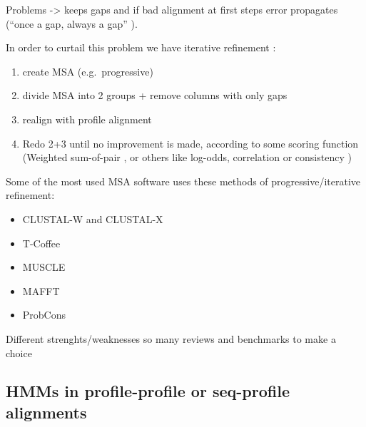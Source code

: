 \documentclass[
  11pt,
  twoside]{scrbook}
\providecommand{\tightlist}{%
  \setlength{\itemsep}{0pt}\setlength{\parskip}{0pt}}
\begin{document}
Problems -\textgreater{} keeps gaps and if bad alignment at first steps error propagates (``once a gap, always a gap'' \autocite{fengProgressiveSequenceAlignment1987}).

In order to curtail this problem we have iterative refinement \autocite{russellMultipleSequenceAlignment2014}:

\begin{enumerate}
\def\labelenumi{\arabic{enumi}.}
\tightlist
\item
  create MSA (e.g.~progressive)
\item
  divide MSA into 2 groups + remove columns with only gaps
\item
  realign with profile alignment
\item
  Redo 2+3 until no improvement is made, according to some scoring function (Weighted sum-of-pair \autocite{altschulWeightsDataRelated1989}, or others like log-odds, correlation \autocite{edgarComparisonScoringFunctions2004} or consistency \autocite{notredameCOFFEEObjectiveFunction1998})
\end{enumerate}

Some of the most used MSA software uses these methods of progressive/iterative refinement:

\begin{itemize}
\item
  CLUSTAL-W \autocite{thompsonCLUSTALImprovingSensitivity1994} and CLUSTAL-X \autocite{thompsonCLUSTALWindowsInterface1997}
\item
  T-Coffee \autocite{notredameTcoffeeNovelMethod2000}
\item
  MUSCLE \autocite{edgarMUSCLEMultipleSequence2004a,edgarMUSCLEMultipleSequence2004}
\item
  MAFFT \autocite{katohMAFFTNovelMethod2002}
\item
  ProbCons \autocite{doProbConsProbabilisticConsistencybased2005}
\end{itemize}

Different strenghts/weaknesses so many reviews and benchmarks to make a choice \autocite{notredameRecentEvolutionsMultiple2007,notredameRecentProgressMultiple2002,edgarMultipleSequenceAlignment2006,paisAssessingEfficiencyMultiple2014,thompsonBAliBASEBenchmarkAlignment1999}

\hypertarget{hmms-in-profile-profile-or-seq-profile-alignments}{%
\subsection{HMMs in profile-profile or seq-profile alignments}\label{hmms-in-profile-profile-or-seq-profile-alignments}}
\end{document}
